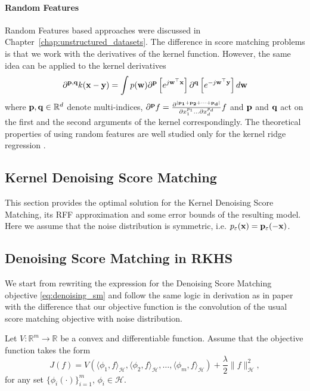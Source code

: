 \paragraph*{Random Features}
\label{sec:inrto_rff}
Random Features based approaches were discussed in Chapter~\ref{chap:unstructured_datasets}.
The difference in score matching problems is that
we work with the derivatives of the kernel function.
However, the same idea can be applied to the kernel derivatives
\begin{equation}
    \partial^{{\bf p}, {\bf q}} k({\bf x - y}) = \int p({\bf w}) \partial^{{\bf p}}\left[e^{j\bf{w^\top x}}\right]\partial^{{\bf q}}\left[e^{-j\bf{w^\top y}}\right]d\bf{w}
\end{equation}
where ${\bf p}, {\bf q} \in \mathbb{R}^d$ denote multi-indices,
$\partial^{\bf{p}} f =
\frac{\partial^{|\bf{p}_1 + \bf{p}_2 + \cdots + \bf{p}_d |} }{\partial x_1^{p_1} \ldots
\partial x_d^{p_d}} f$
and $\bf{p}$ and $\bf{q}$ act on the first and the second arguments of
the kernel correspondingly.
The theoretical properties of using random features are well studied only for the
kernel ridge regression \cite{aless2016generalization, li2018unified}.

\subsection{Kernel Denoising Score Matching}
\label{chap:body}
This section provides the optimal solution for the Kernel Denoising Score Matching,
its RFF approximation and some error bounds of the resulting model.
Here we assume that the noise distribution is symmetric, i.e.
$p_{\varepsilon}(\bf{x}) = p_{\varepsilon}(-\bf{x})$.

\subsection{Denoising Score Matching in RKHS}
We start from rewriting the expression for the Denoising Score Matching objective
\eqref{eq:denoising_sm}
and follow the same logic in derivation as in paper \cite{Gretton2013}
with the difference that our objective function is the convolution of the usual
score matching objective with noise distribution.

Let $V: \mathbb{R}^m \to \mathbb{R}$ be a convex and differentiable function.
Assume that the objective function takes the form
\[
    J(f) = V(\langle \phi_1, f\rangle_\mathcal{H},
             \langle \phi_2, f\rangle_\mathcal{H}, \ldots,
             \langle \phi_m, f\rangle_\mathcal{H}) + \frac{\lambda}{2}\|f\|^2_\mathcal{H},
\]
for any set $\{\phi_i(\cdot)\}_{i = 1}^m$, $\phi_i \in \mathcal{H}$.


